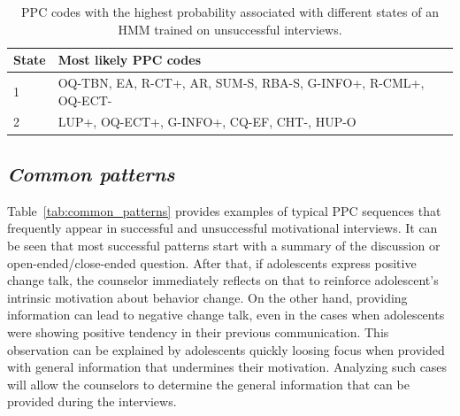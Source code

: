 \documentclass{amia_summit_2018}
\begin{document}
\begin{table}[!htb]
\centering
\caption{PPC codes with the highest probability associated with different states of an HMM trained on unsuccessful interviews.}
\label{tab:emission_matrix_u}
  \begin{tabular}{|l|l|}
  \hline
   \textbf{State} & \textbf{Most likely PPC codes} \\\hline     
1 & OQ-TBN, EA, R-CT+, AR, SUM-S, RBA-S, G-INFO+, R-CML+, OQ-ECT- \\\hline
2 & LUP+, OQ-ECT+, G-INFO+, CQ-EF, CHT-, HUP-O \\\hline
  \end{tabular}
\end{table} 

\subsection*{\textit{Common patterns}}
Table~\ref{tab:common_patterns} provides examples of typical PPC sequences that frequently appear in successful and unsuccessful motivational interviews. It can be seen that most successful patterns start with a summary of the discussion or open-ended/close-ended question. After that, if adolescents express positive change talk, the counselor immediately reflects on that to reinforce adolescent's intrinsic motivation about behavior change. On the other hand, providing information can lead to negative change talk, even in the cases when adolescents were showing positive tendency in their previous communication. This observation can be explained by adolescents quickly loosing focus when provided with general information that undermines their motivation. Analyzing such cases will allow the counselors to determine the general information that can be provided during the interviews. \\
\end{document}
